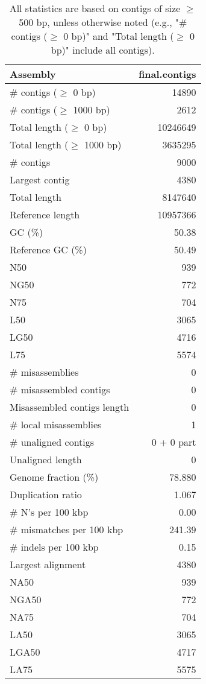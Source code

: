 \documentclass[12pt,a4paper]{article}
\begin{document}
\begin{table}[ht]
\begin{center}
\caption{All statistics are based on contigs of size $\geq$ 500 bp, unless otherwise noted (e.g., "\# contigs ($\geq$ 0 bp)" and "Total length ($\geq$ 0 bp)" include all contigs).}
\begin{tabular}{|l*{1}{|r}|}
\hline
Assembly & final.contigs \\ \hline
\# contigs ($\geq$ 0 bp) & 14890 \\ \hline
\# contigs ($\geq$ 1000 bp) & 2612 \\ \hline
Total length ($\geq$ 0 bp) & 10246649 \\ \hline
Total length ($\geq$ 1000 bp) & 3635295 \\ \hline
\# contigs & 9000 \\ \hline
Largest contig & 4380 \\ \hline
Total length & 8147640 \\ \hline
Reference length & 10957366 \\ \hline
GC (\%) & 50.38 \\ \hline
Reference GC (\%) & 50.49 \\ \hline
N50 & 939 \\ \hline
NG50 & 772 \\ \hline
N75 & 704 \\ \hline
L50 & 3065 \\ \hline
LG50 & 4716 \\ \hline
L75 & 5574 \\ \hline
\# misassemblies & 0 \\ \hline
\# misassembled contigs & 0 \\ \hline
Misassembled contigs length & 0 \\ \hline
\# local misassemblies & 1 \\ \hline
\# unaligned contigs & 0 + 0 part \\ \hline
Unaligned length & 0 \\ \hline
Genome fraction (\%) & 78.880 \\ \hline
Duplication ratio & 1.067 \\ \hline
\# N's per 100 kbp & 0.00 \\ \hline
\# mismatches per 100 kbp & 241.39 \\ \hline
\# indels per 100 kbp & 0.15 \\ \hline
Largest alignment & 4380 \\ \hline
NA50 & 939 \\ \hline
NGA50 & 772 \\ \hline
NA75 & 704 \\ \hline
LA50 & 3065 \\ \hline
LGA50 & 4717 \\ \hline
LA75 & 5575 \\ \hline
\end{tabular}
\end{center}
\end{table}
\end{document}
